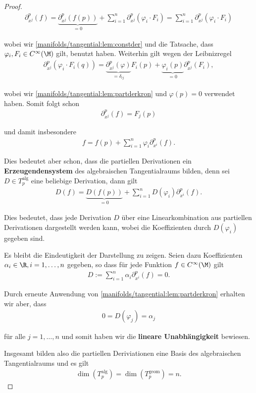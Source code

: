 \documentclass[letterpaper,10pt,german]{jupyterBook}
\begin{document}
\begin{proof}
\begin{align*}
\partial_{x^j}^p (f) = 
\underbrace{\partial_{x^j}^p (f(p))}_{=0} + 
\sum_{i=1}^{n} \partial_{x^j}^p(\varphi_i \cdot F_i) = 
\sum_{i=1}^{n} \partial_{x^j}^p(\varphi_i \cdot F_i)
\end{align*}
\par
wobei wir \cref{manifolds/tangential:lem:constder} und die Tatsache, dass \(\varphi_i, F_i\in C^\infty(\M)\) gilt, benutzt haben.
Weiterhin gilt wegen der Leibnizregel
\begin{align*}
\partial_{x^j}^p(\varphi_i \cdot F_i(q)) = 
\underbrace{\partial_{x^j}^p(\varphi)}_{=\delta_{ij}} F_i(p)+ \underbrace{\varphi_i(p)}_{=0} \partial_{x^j}^p(F_i),
\end{align*}
\par
wobei wir \cref{manifolds/tangential:lem:partderkron} und \(\varphi(p)=0\) verwendet haben.
Somit folgt schon
\begin{align*}
\partial_{x^j}^p (f) = F_j(p)
\end{align*}
\par
und damit insbesondere
\begin{align*}
f = f(p) + \sum_{i=1}^{n} \varphi_i \partial_{x^i}^p(f).
\end{align*}
\par
Dies bedeutet aber schon, dass die partiellen Derivationen ein \textbf{Erzeugendensystem} des algebraischen Tangentialraums bilden, denn sei \(D\in T^{\text{alg}}_p\) eine beliebige Derivation, dann gilt
\begin{align*}
D(f) = \underbrace{D(f(p))}_{=0} + \sum_{i=1}^n D(\varphi_i) \partial_{x^i}^p(f).
\end{align*}
\par
Dies bedeutet, dass jede Derivation \(D\) über eine Linearkombination aus partiellen Derivationen dargestellt werden kann, wobei die Koeffizienten durch \(D(\varphi_i)\) gegeben sind.

\par
Es bleibt die Eindeutigkeit der Darstellung zu zeigen.
Seien dazu Koeffizienten \(\alpha_i \in \R, i=1,\ldots,n\) gegeben, so dass für jede Funktion \(f\in C^\infty(\M)\) gilt
\begin{align*}
D:= \sum_{i=1}^n \alpha_i \partial_{x^i}^p(f) = 0.
\end{align*}
\par
Durch erneute Anwendung von \cref{manifolds/tangential:lem:partderkron} erhalten wir aber, dass
\begin{align*}
0 = D(\varphi_j) = \alpha_j\end{align*}
\par
für alle \(j=1,\ldots,n\) und somit haben wir die \textbf{lineare Unabhängigkeit} bewiesen.

\par
Insgesamt bilden also die partiellen Deriviationen eine Basis des algebraischen Tangentialraums und es gilt
\begin{align*}
\dim(T^{\text{alg}}_p)=\dim(T^{\text{geom}}_p)=n.
\end{align*}\end{proof}
\end{document}
